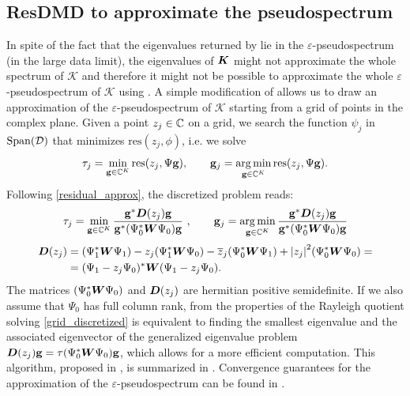 \subsection{ResDMD to approximate the pseudospectrum}
In spite of the fact that the eigenvalues returned by  lie in the $\varepsilon$-pseudospectrum (in the large data limit), the eigenvalues of $\vb*{K}$ might not approximate the whole spectrum of $\mathcal{K}$ and therefore it might not be possible to approximate the whole $\varepsilon$-pseudospectrum of $\mathcal{K}$ using . A simple modification of  allows us to draw an approximation of the $\varepsilon$-pseudospectrum of $\mathcal{K}$ starting from a grid of points in the complex plane. Given a point $z_j\in\mathbb{C}$ on a grid, we search the function $\psi_j$ in $\mathrm{Span}(\mathcal{D})$ that minimizes $\mathrm{res}(z_j, \phi)$, i.e. we solve
\begin{equation}
    \label{grid_continuous}
    \tau_j = \min_{\vb{g}\in\mathbb{C}^K} \mathrm{res}(z_j, \Psi\vb{g}), \qquad \vb{g}_j = \operatorname*{arg\,min}_{\vb{g}\in\mathbb{C}^K} \mathrm{res}(z_j, \Psi\vb{g}).
\end{equation}
Following \eqref{residual_approx}, the discretized problem reads:
\begin{equation}
    \label{grid_discretized}
    \tau_j = \min_{\vb{g}\in\mathbb{C}^K} \frac{\vb{g}^*\vb*{D}(z_j)\vb{g}}{\vb{g}^*(\Psi_0^*\vb*{W}\Psi_0)\vb{g}}\,\,, \qquad \vb{g}_j = \operatorname*{arg\,min}_{\vb{g}\in\mathbb{C}^K} \frac{\vb{g}^*\vb*{D}(z_j)\vb{g}}{\vb{g}^*(\Psi_0^*\vb*{W}\Psi_0)\vb{g}}
\end{equation}
\begin{equation}
    \label{D(z)_definition}
    \begin{split}
        \vb*{D}(z_j) &= (\Psi_1^*\vb*{W}\Psi_1) - z_j (\Psi_1^*\vb*{W}\Psi_0) - \overline{z}_j(\Psi_0^*\vb*{W}\Psi_1) + \abs{z_j}^2 (\Psi_0^*\vb*{W}\Psi_0) =\\ 
        & = (\Psi_1 - z_j\Psi_0)^*\vb*{W}(\Psi_1 - z_j\Psi_0).
    \end{split}
\end{equation}
The matrices $(\Psi_0^*\vb*{W}\Psi_0)$ and $\vb*{D}(z_j)$ are hermitian positive semidefinite. If we also assume that $\Psi_0$ has full column rank, from the properties of the Rayleigh quotient solving \eqref{grid_discretized} is equivalent to finding the smallest eigenvalue and the associated eigenvector of the generalized eigenvalue problem $\vb*{D}(z_j)\vb{g} = \tau(\Psi_0^*\vb*{W}\Psi_0)\vb{g}$, which allows for a more efficient computation. This algorithm, proposed in \cite{colbrook_rigorous_2021}, is summarized in . Convergence guarantees for the approximation of the $\varepsilon$-pseudospectrum can be found in \cite{colbrook_rigorous_2021}.

